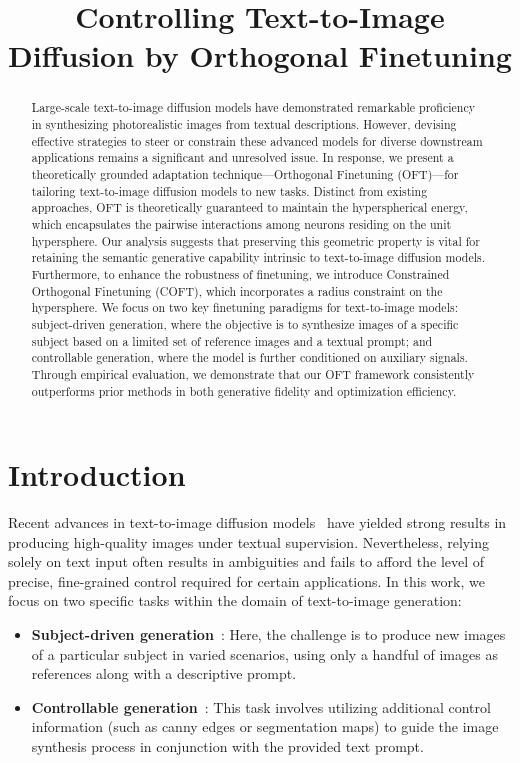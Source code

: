 \title{Controlling Text-to-Image Diffusion by Orthogonal Finetuning}

\begin{abstract}
Large-scale text-to-image diffusion models have demonstrated remarkable proficiency in synthesizing photorealistic images from textual descriptions. However, devising effective strategies to steer or constrain these advanced models for diverse downstream applications remains a significant and unresolved issue. In response, we present a theoretically grounded adaptation technique—Orthogonal Finetuning (OFT)—for tailoring text-to-image diffusion models to new tasks. Distinct from existing approaches, OFT is theoretically guaranteed to maintain the hyperspherical energy, which encapsulates the pairwise interactions among neurons residing on the unit hypersphere. Our analysis suggests that preserving this geometric property is vital for retaining the semantic generative capability intrinsic to text-to-image diffusion models. Furthermore, to enhance the robustness of finetuning, we introduce Constrained Orthogonal Finetuning (COFT), which incorporates a radius constraint on the hypersphere. We focus on two key finetuning paradigms for text-to-image models: subject-driven generation, where the objective is to synthesize images of a specific subject based on a limited set of reference images and a textual prompt; and controllable generation, where the model is further conditioned on auxiliary signals. Through empirical evaluation, we demonstrate that our OFT framework consistently outperforms prior methods in both generative fidelity and optimization efficiency.
\end{abstract}

\section{Introduction}

Recent advances in text-to-image diffusion models~\cite{saharia2022photorealistic,ramesh2022hierarchical,rombach2022high} have yielded strong results in producing high-quality images under textual supervision. Nevertheless, relying solely on text input often results in ambiguities and fails to afford the level of precise, fine-grained control required for certain applications. In this work, we focus on two specific tasks within the domain of text-to-image generation:

\begin{itemize}[leftmargin=*,nosep]

    \item \textbf{Subject-driven generation}~\cite{ruiz2023dreambooth}: Here, the challenge is to produce new images of a particular subject in varied scenarios, using only a handful of images as references along with a descriptive prompt.
    \item \textbf{Controllable generation}~\cite{zhang2023adding,mou2023t2i}: This task involves utilizing additional control information (such as canny edges or segmentation maps) to guide the image synthesis process in conjunction with the provided text prompt.
\end{itemize}

